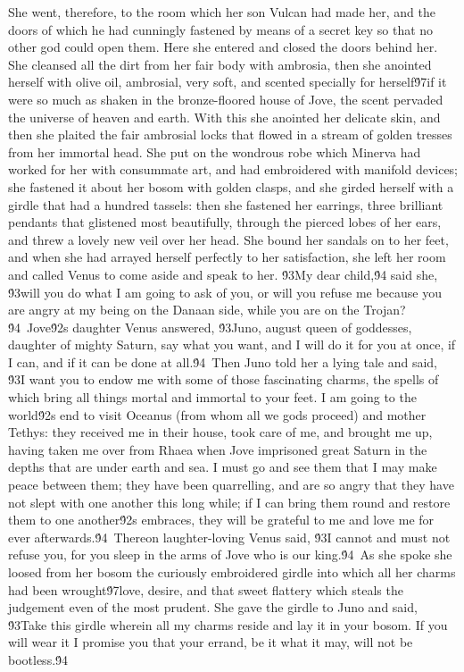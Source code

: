 {She went, therefore, to the room which her son Vulcan had made her, and the doors of which he had cunningly fastened by means of a secret key so that no other god could open them. Here she entered and closed the doors behind her. She cleansed all the dirt from her fair body with ambrosia, then she anointed herself with olive oil, ambrosial, very soft, and scented specially for herself\'97if it were so much as shaken in the bronze-floored house of Jove, the scent pervaded the universe of heaven and earth. With this she anointed her delicate skin, and then she plaited the fair ambrosial locks that flowed in a stream of golden tresses from her immortal head. She put on the wondrous robe which Minerva had worked for her with consummate art, and had embroidered with manifold devices; she fastened it about her bosom with golden clasps, and she girded herself with a girdle that had a hundred tassels: then she fastened her earrings, three brilliant pendants that glistened most beautifully, through the pierced lobes of her ears, and threw a lovely new veil over her head. She bound her sandals on to her feet, and when she had arrayed herself perfectly to her satisfaction, she left her room and called Venus to come aside and speak to her. \'93My dear child,\'94 said she, \'93will you do what I am going to ask of you, or will you refuse me because you are angry at my being on the Danaan side, while you are on the Trojan?\'94\
Jove\'92s daughter Venus answered, \'93Juno, august queen of goddesses, daughter of mighty Saturn, say what you want, and I will do it for you at once, if I can, and if it can be done at all.\'94\
Then Juno told her a lying tale and said, \'93I want you to endow me with some of those fascinating charms, the spells of which bring all things mortal and immortal to your feet. I am going to the world\'92s end to visit Oceanus (from whom all we gods proceed) and mother Tethys: they received me in their house, took care of me, and brought me up, having taken me over from Rhaea when Jove imprisoned great Saturn in the depths that are under earth and sea. I must go and see them that I may make peace between them; they have been quarrelling, and are so angry that they have not slept with one another this long while; if I can bring them round and restore them to one another\'92s embraces, they will be grateful to me and love me for ever afterwards.\'94\
Thereon laughter-loving Venus said, \'93I cannot and must not refuse you, for you sleep in the arms of Jove who is our king.\'94\
As she spoke she loosed from her bosom the curiously embroidered girdle into which all her charms had been wrought\'97love, desire, and that sweet flattery which steals the judgement even of the most prudent. She gave the girdle to Juno and said, \'93Take this girdle wherein all my charms reside and lay it in your bosom. If you will wear it I promise you that your errand, be it what it may, will not be bootless.\'94\
}
